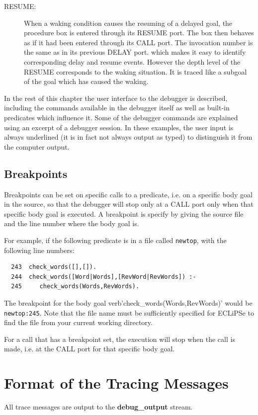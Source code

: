 \begin{description}
\item[RESUME:] When a waking condition causes the resuming of
a delayed goal, the procedure box is entered through its RESUME
port.  The box then behaves as if it had been entered through its CALL
port.  The invocation number is the same as in its previous DELAY port.
which makes it easy to identify corresponding delay and resume events.
However the depth level of the RESUME corresponds to the waking situation.
It is traced like a subgoal of the goal which has caused the waking.

\end{description}

In the rest of this chapter the user interface to the debugger is
described, including the commands available in the debugger itself as
well as built-in predicates which influence it.  Some of the debugger
commands are explained using an excerpt of a debugger session.  In
these examples, the user input is always underlined (it is in fact
not always output as typed) to distinguish it from the computer output.

\subsection{Breakpoints}

Breakpoints can be set on specific calls to a predicate, i.e. on a specific
body goal in the source, so that the
debugger will stop only at a CALL port only when that specific body goal is 
executed. A breakpoint is specify by giving the source file and the line
number where the body goal is. 

For example, if the following predicate is in a file called \verb'newtop',
with the following line numbers:

\begin{verbatim}
  243  check_words([],[]).
  244  check_words([Word|Words],[RevWord|RevWords]) :-
  245     check_words(Words,RevWords).
\end{verbatim}

The breakpoint for the body goal verb'check_words(Words,RevWords)' would be
\verb'newtop:245'. Note that the file name must be sufficiently specified 
for ECLiPSe to find the file from your current working directory.

For a call that has a breakpoint set, the execution will stop when the call
is made, i.e. at the CALL port for that specific body goal.

\section{Format of the Tracing Messages}
All trace messages are output to the
{\bf debug_output} stream.

